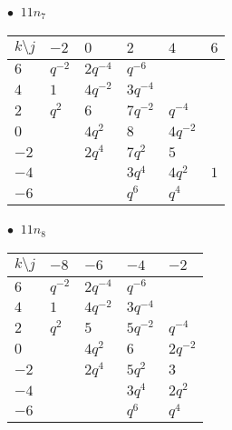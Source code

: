 %
\begin{minipage}{\linewidth}
$\bullet\ $ $11n_{7}$ \vspace{0.5em} \\
\begin{tabular}{l|lllll}
$k \setminus j$ & $-2$ & $0$ & $2$ & $4$ & $6$ \\
\hline
$6$ & $q^{-2}$ & $2q^{-4}$ & $q^{-6}$ &  &  \\
$4$ & $1$ & $4q^{-2}$ & $3q^{-4}$ &  &  \\
$2$ & $q^{2}$ & $6$ & $7q^{-2}$ & $q^{-4}$ &  \\
$0$ &  & $4q^{2}$ & $8$ & $4q^{-2}$ &  \\
$-2$ &  & $2q^{4}$ & $7q^{2}$ & $5$ &  \\
$-4$ &  &  & $3q^{4}$ & $4q^{2}$ & $1$ \\
$-6$ &  &  & $q^{6}$ & $q^{4}$ &  \\
\end{tabular}
\vspace{2em}
\end{minipage}
%
\begin{minipage}{\linewidth}
$\bullet\ $ $11n_{8}$ \vspace{0.5em} \\
\begin{tabular}{l|llll}
$k \setminus j$ & $-8$ & $-6$ & $-4$ & $-2$ \\
\hline
$6$ & $q^{-2}$ & $2q^{-4}$ & $q^{-6}$ &  \\
$4$ & $1$ & $4q^{-2}$ & $3q^{-4}$ &  \\
$2$ & $q^{2}$ & $5$ & $5q^{-2}$ & $q^{-4}$ \\
$0$ &  & $4q^{2}$ & $6$ & $2q^{-2}$ \\
$-2$ &  & $2q^{4}$ & $5q^{2}$ & $3$ \\
$-4$ &  &  & $3q^{4}$ & $2q^{2}$ \\
$-6$ &  &  & $q^{6}$ & $q^{4}$ \\
\end{tabular}
\vspace{2em}
\end{minipage}
%
